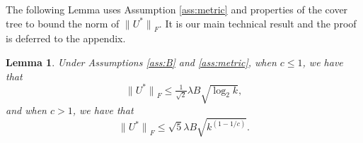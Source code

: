 \documentclass[twoside]{article}
\newtheorem{lemma}{Lemma}
\renewcommand{\star}[1]{{#1}^{*}}
\newcommand{\lF}[1]{{\lVert {#1} \rVert}_F}
\begin{document}
The following Lemma uses Assumption \ref{ass:metric} and properties of the cover tree to bound the norm of $\lF{\star U}$.
It is our main technical result and the proof is deferred to the appendix.

\begin{lemma}
    \label{lemma:main}
    Under Assumptions \ref{ass:B} and \ref{ass:metric},
    when $c\le1$, we have that
    \begin{equation}
        \lF{\star U} \le \tfrac{1}{\sqrt2}\lambda B \sqrt{\log_2 k},
        \label{eq:c<=1}
    \end{equation}
    and when $c>1$, we have that
    \begin{equation}
        \lF{\star U} \le \sqrt{5}\lambda B \sqrt{k^{(1-1/c)}}.
        \label{eq:c>1}
    \end{equation}
\end{lemma}
\end{document}
